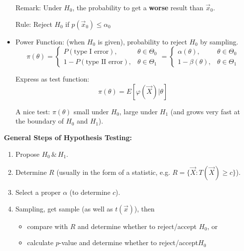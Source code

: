 \begin{itemize}[topsep = -3 pt]
        Remark: Under $H_0$, the probability to get a \textbf{worse} result than $\vec{x}_0$.
        
        Rule: Reject $H_0$ if $p(\vec{x}_0)\leq\alpha_0$

        \item Power Function: (when $H_0$ is given), probability to reject $H_0$ by sampling.
        \[
            \pi(\theta)=\begin{cases}
                P(\text{type I error}),& \theta\in\Theta_0\\
                1-P(\text{type II error}),& \theta\in\Theta_1
            \end{cases}
            =
            \begin{cases}
                \alpha(\theta),&\theta\in\Theta_0\\
                1-\beta(\theta),&\theta\in\Theta_1
            \end{cases}
        \]

        Express as test function:
        \[
            \pi(\theta)=E[\varphi(\vec{X})|\theta]
        \]

        A nice test: $\pi(\theta)$ small under $H_0$, large under $H_1$ (and grows very fast at the boundary of $ H_0 $ and $ H_1 $).
        \end{itemize}

        \begin{point}
            \textbf{General Steps of Hypothesis Testing:}
        \end{point}
        
        

        \begin{enumerate}[topsep=0pt]
            \item Propose $H_0\,\&\, H_1$.
            \item Determine $R$ (usually in the form of a statistic, e.g. $R=\{\vec{X}:T(\vec{X})\geq c\}$).
            \item Select a proper $\alpha$ (to determine $c$).
            \item Sampling, get sample (as well as $t(\vec{x})$), then 
            \begin{itemize}[topsep=-1pt,itemsep=-2pt]
                \item compare with $R$ and determine whether to reject/accept $H_0$, or
                \item calculate $ p $-value and determine whether to reject/accept$ H_0 $
            \end{itemize}
            
                
            

        \end{enumerate}

